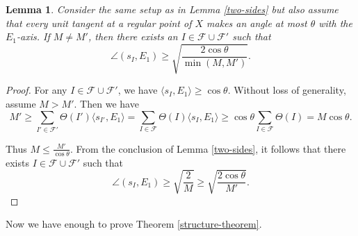 \documentclass[10pt,a4paper]{amsart}
\newtheorem{lemma}{Lemma}
\begin{document}
\begin{lemma} \label{same-mult}
    Consider the same setup as in Lemma \ref{two-sides} but also assume that every unit tangent at a regular point of $X$ makes an angle at most $\theta$ with the $E_1$-axis. If $M \neq M'$, then there exists an $I \in \mathcal{F} \cup \mathcal{F}'$ such that 
    \[\angle(s_I,E_1) \geq \sqrt{\frac{2\cos \theta}{\min(M,M')}}.\]
\end{lemma}
\begin{proof}
    For any $I \in \mathcal{F} \cup \mathcal{F}'$, we have $\langle s_I,E_1\rangle \geq \cos \theta$. Without loss of generality, assume $M > M'$. Then we have
    \[M' \geq \sum_{I' \in \mathcal{F}'} \Theta(I') \langle s_{I'},E_1\rangle = \sum_{I \in \mathcal{F}} \Theta(I) \langle s_I,E_1\rangle \geq \cos \theta\sum_{I \in \mathcal{F}} \Theta(I) = M \cos \theta.\]

Thus $M \leq \frac{M'}{\cos \theta}$. From the conclusion of Lemma \ref{two-sides}, it follows that there exists $I \in \mathcal{F} \cup \mathcal{F}'$ such that 
\[\angle(s_I,E_1) \geq \sqrt{\frac{2}{M}} \geq \sqrt{\frac{2\cos \theta}{M'}}.\]
\end{proof}

Now we have enough to prove Theorem \ref{structure-theorem}.
\end{document}
